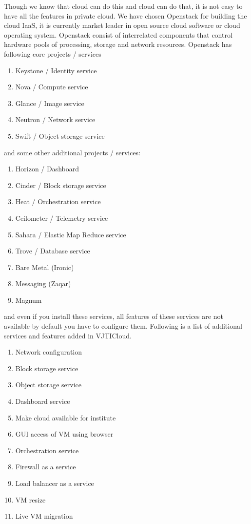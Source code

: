 Though we know that cloud can do this and cloud can do that, it is not easy to have all the features in private cloud. We have chosen Openstack for building the cloud IaaS, it is currently market leader in open source cloud software or cloud operating system. Openstack consist of interrelated components that control hardware pools of processing, storage and network resources\cite{wiki}. Openstack has following core projects / services
\begin{enumerate}
    \item Keystone / Identity service
    \item Nova / Compute service
    \item Glance / Image service
    \item Neutron / Network service
    \item Swift / Object storage service
\end{enumerate}

and some other additional projects / services:
\begin{enumerate}
    \item Horizon / Dashboard
    \item Cinder / Block storage service
    \item Heat / Orchestration service
    \item Ceilometer / Telemetry service
    \item Sahara / Elastic Map Reduce service
    \item Trove / Database service
    \item Bare Metal (Ironic)
    \item Messaging (Zaqar)
    \item Magnum
\end{enumerate}

and even if you install these services, all features of these services are not available by default you have to configure them. Following is a list of additional services and features added in VJTICloud.

\begin{enumerate}
  \item Network configuration
  \item Block storage service
  \item Object storage service
  \item Dashboard service
  \item Make cloud available for institute
  \item GUI access of VM using browser
  \item Orchestration service
  \item Firewall as a service
  \item Load balancer as a service
  \item VM resize 
  \item Live VM migration
\end{enumerate}

